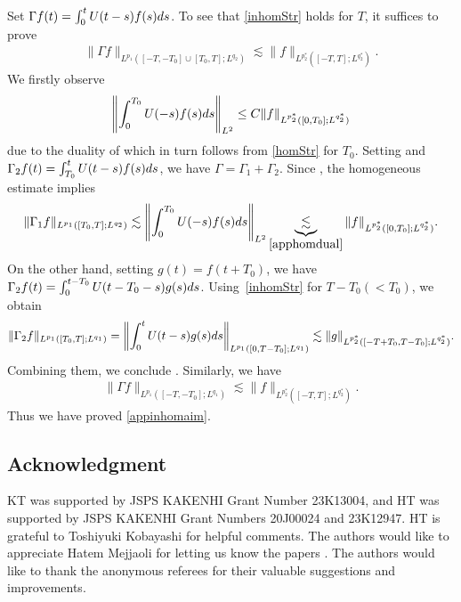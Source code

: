 \documentclass[10pt,a4paper]{article}
\numberwithin{equation}{section}
\begin{document}
Set $\Gamma f(t)=\int_0^tU(t-s)f(s){\rm d}s$.
To see that \eqref{inhomStr} holds for $T$, it suffices to prove
\begin{align}\label{appinhomaim}
\|\Gamma f\|_{L^{p_1}([-T,-T_0]\cup [T_0,T];L^{q_2})}\lesssim \|f\|_{L^{p_2^*}([-T,T];L^{q_2^*})}.
\end{align}
We firstly observe
\begin{align}\label{apphomdual}
\left\|\int_0^{T_0}U(-s)f(s){\rm d}s \right\|_{L^2}\leq C\|f\|_{L^{p_2^*}([0,T_0];L^{q_2^*})}
\end{align}
due to the duality of  which in turn follows from \eqref{homStr} for $T_0$. Setting  and $\Gamma_2f(t)=\int_{T_0}^tU(t-s)f(s){\rm d}s$, we have $\Gamma=\Gamma_1+\Gamma_2$. Since , the homogeneous estimate  implies
\begin{align*}
\|\Gamma_1 f\|_{L^{p_1}([T_0,T];L^{q_2})}\lesssim\left\|\int_0^{T_0}U(-s)f(s){\rm d}s \right\|_{L^2}\underbrace{\lesssim}_{\eqref{apphomdual}} \|f\|_{L^{p_2^*}([0,T_0];L^{q_2^*})}.
\end{align*}
On the other hand, setting $g(t)=f(t+T_0)$, we have $\Gamma_2f(t)=\int_0^{t-T_0}U(t-T_0-s)g(s){\rm d}s$. Using~\eqref{inhomStr} for $T-T_0(<T_0)$, we obtain
\begin{align*}
\|\Gamma_2f\|_{L^{p_1}([T_0,T];L^{q_1})}=\left\|\int_0^{t}U(t-s)g(s){\rm d}s\right\|_{L^{p_1}([0,T-T_0];L^{q_1})}\lesssim \|g\|_{L^{p_2^*}([-T+T_0,T-T_0];L^{q_2^*})}.
\end{align*}
Combining them, we conclude . Similarly, we have
\begin{align*}
\|\Gamma f\|_{L^{p_1}([-T,-T_0];L^{q_1})}\lesssim \|f\|_{L^{p_2^*}([-T,T];L^{q_2^*})}.
\end{align*}
Thus we have proved \eqref{appinhomaim}.

\subsection*{Acknowledgment}
KT was supported by JSPS KAKENHI Grant Number 23K13004, and HT was supported by JSPS KAKENHI Grant Numbers 20J00024 and 23K12947. HT is grateful to Toshiyuki Kobayashi for helpful comments. The authors would like to appreciate Hatem Mejjaoli for letting us know the papers \cite{BMMS,M}. The authors would like to thank the anonymous referees for their valuable suggestions and improvements.
\end{document}
